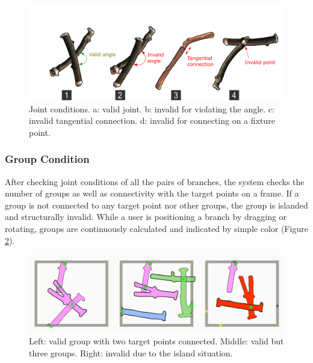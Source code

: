 
\begin{figure}[ht]
  \begin{center}
    \includegraphics[width = 0.4\paperwidth]{images/system/joint_conditions_2.png}
    \caption{Joint conditions. a: valid joint. b: invalid for violating the angle. c: invalid tangential connection. d: invalid for connecting on a fixture point. }
    \label{fig:joint_condition}
  \end{center}
\end{figure}

\subsubsection*{Group Condition}

After checking joint conditions of all the pairs of branches, the system checks the number of groups as well as connectivity with the target points on a frame.
If a group is not connected to any target point nor other groups, the group is islanded and structurally invalid.
While a user is positioning a branch by dragging or rotating, groups are continuously calculated and indicated by simple color (Figure \ref{fig:group}).

\begin{figure}[ht]
  \begin{center}
    \includegraphics[width = 0.4\paperwidth]{images/interface/groups.jpg}
    \caption{Left: valid group with two target points connected. Middle: valid but three groups. Right: invalid due to the island situation. }
    \label{fig:group}
  \end{center}
\end{figure}


